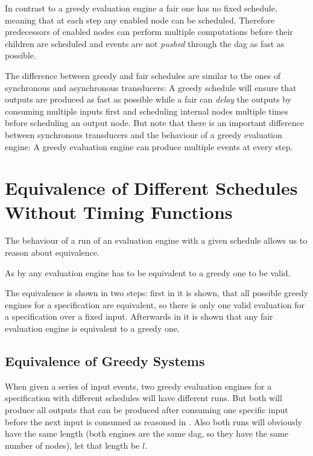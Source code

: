 In contrast to a greedy evaluation engine a fair one has no fixed schedule, meaning that at each step any enabled node can be scheduled.
Therefore predecessors of enabled nodes can perform multiple computations before their children are scheduled and events are not \emph{pushed} through the \gls{dag} as fast as possible.

The difference between greedy and fair schedules are similar to the ones of synchronous and asynchronous transducers: A greedy schedule will ensure that outputs are produced as fast as possible while a fair can \emph{delay} the outputs by consuming multiple inputs first and scheduling internal nodes multiple times before scheduling an output node.
But note that there is an important difference between synchronous transducers and the behaviour of a greedy evaluation engine: A greedy evaluation engine can produce multiple events at every step.

\section{Equivalence of Different Schedules Without Timing Functions}
\label{sec:behaviours:equivalence_without_timing}

The behaviour of a run of an evaluation engine with a given schedule allows us to reason about equivalence.

As by  any evaluation engine has to be equivalent to a greedy one to be valid.

The equivalence is shown in two steps: first in  it is shown, that all possible greedy engines for a specification are equivalent, so there is only one valid evaluation for a specification over a fixed input.
Afterwards in  it is shown that any fair evaluation engine is equivalent to a greedy one.


\subsection{Equivalence of Greedy Systems}
\label{sec:behaviours:equivalence_without_timing:greedy}

When given a series of input events, two greedy evaluation engines for a specification with different schedules will have different runs.
But both will produce all outputs that can be produced after consuming one specific input before the next input is consumed as reasoned in .
Also both runs will obviously have the same length (both engines are the same \gls{dag}, so they have the same number of nodes), let that length be \(l\).

